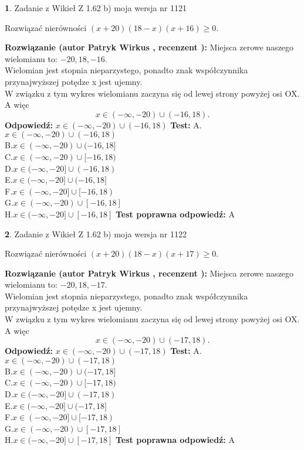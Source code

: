 \documentclass[12pt, a4paper]{article}
\theoremstyle{definition} %
\newtheorem{zad}{}
\newcommand{\zadStart}[1]{\begin{zad}#1\newline}
\newcommand{\zadStop}{\end{zad}}
\newcommand{\rozwStart}[2]{\noindent \textbf{Rozwiązanie (autor #1 , recenzent #2): }\newline}
\newcommand{\rozwStop}{\newline}
\newcommand{\odpStart}{\noindent \textbf{Odpowiedź:}\newline}
\newcommand{\odpStop}{\newline}
\newcommand{\testStart}{\noindent \textbf{Test:}\newline}
\newcommand{\testStop}{\newline}
\newcommand{\kluczStart}{\noindent \textbf{Test poprawna odpowiedź:}\newline}
\newcommand{\kluczStop}{\newline}
\begin{document}
\zadStart{Zadanie z Wikieł Z 1.62 b) moja wersja nr 1121}

Rozwiązać nierówności $(x+20)(18-x)(x+16)\ge0$.
\zadStop
\rozwStart{Patryk Wirkus}{}
Miejsca zerowe naszego wielomianu to: $-20, 18, -16$.\\
Wielomian jest stopnia nieparzystego, ponadto znak współczynnika przy\linebreak najwyższej potędze x jest ujemny.\\ W związku z tym wykres wielomianu zaczyna się od lewej strony powyżej osi OX. A więc $$x \in (-\infty,-20) \cup (-16,18).$$
\rozwStop
\odpStart
$x \in (-\infty,-20) \cup (-16,18)$
\odpStop
\testStart
A.$x \in (-\infty,-20) \cup (-16,18)$\\
B.$x \in (-\infty,-20) \cup (-16,18]$\\
C.$x \in (-\infty,-20) \cup [-16,18)$\\
D.$x \in (-\infty,-20] \cup (-16,18)$\\
E.$x \in (-\infty,-20] \cup (-16,18]$\\
F.$x \in (-\infty,-20] \cup [-16,18)$\\
G.$x \in (-\infty,-20) \cup [-16,18]$\\
H.$x \in (-\infty,-20] \cup [-16,18]$
\testStop
\kluczStart
A
\kluczStop



\zadStart{Zadanie z Wikieł Z 1.62 b) moja wersja nr 1122}

Rozwiązać nierówności $(x+20)(18-x)(x+17)\ge0$.
\zadStop
\rozwStart{Patryk Wirkus}{}
Miejsca zerowe naszego wielomianu to: $-20, 18, -17$.\\
Wielomian jest stopnia nieparzystego, ponadto znak współczynnika przy\linebreak najwyższej potędze x jest ujemny.\\ W związku z tym wykres wielomianu zaczyna się od lewej strony powyżej osi OX. A więc $$x \in (-\infty,-20) \cup (-17,18).$$
\rozwStop
\odpStart
$x \in (-\infty,-20) \cup (-17,18)$
\odpStop
\testStart
A.$x \in (-\infty,-20) \cup (-17,18)$\\
B.$x \in (-\infty,-20) \cup (-17,18]$\\
C.$x \in (-\infty,-20) \cup [-17,18)$\\
D.$x \in (-\infty,-20] \cup (-17,18)$\\
E.$x \in (-\infty,-20] \cup (-17,18]$\\
F.$x \in (-\infty,-20] \cup [-17,18)$\\
G.$x \in (-\infty,-20) \cup [-17,18]$\\
H.$x \in (-\infty,-20] \cup [-17,18]$
\testStop
\kluczStart
A
\kluczStop
\end{document}
